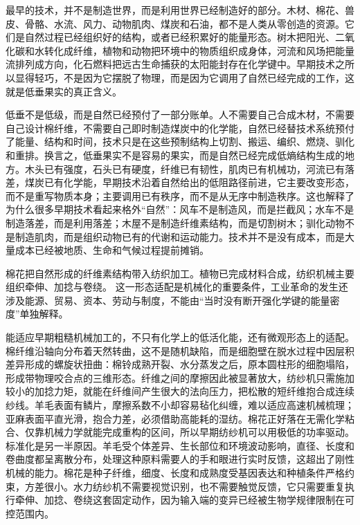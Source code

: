 最早的技术，并不是制造世界，而是利用世界已经制造好的部分。木材、棉花、兽皮、骨骼、水流、风力、动物肌肉、煤炭和石油，都不是人类从零创造的资源。它们是自然过程已经组织好的结构，或者已经积累好的能量形态。树木把阳光、二氧化碳和水转化成纤维，植物和动物把环境中的物质组织成身体，河流和风场把能量流排列成方向，化石燃料把远古生命捕获的太阳能封存在化学键中。早期技术之所以显得轻巧，不是因为它摆脱了物理，而是因为它调用了自然已经完成的工作，这就是低垂果实的真正含义。


低垂不是低级，而是自然已经预付了一部分账单。人不需要自己合成木材，不需要自己设计棉纤维，不需要自己即时制造煤炭中的化学能，自然已经替技术系统预付了能量、结构和时间，技术只是在这些预制结构上切割、搬运、编织、燃烧、驯化和重排。换言之，低垂果实不是容易的果实，而是自然已经完成低熵结构生成的地方。木头已有强度，石头已有硬度，纤维已有韧性，肌肉已有机械功，河流已有落差，煤炭已有化学能，早期技术沿着自然给出的低阻路径前进，它主要改变形态，而不是重写物质本身；主要调用已有秩序，而不是从无序中制造秩序。这也解释了为什么很多早期技术看起来格外“自然”：风车不是制造风，而是拦截风；水车不是制造落差，而是利用落差；木屋不是制造纤维素结构，而是切割树木；驯化动物不是制造肌肉，而是组织动物已有的代谢和运动能力。技术并不是没有成本，而是大量成本已经被地质、生命和气候过程提前摊销。

棉花把自然形成的纤维素结构带入纺织加工。植物已完成材料合成，纺织机械主要组织牵伸、加捻与卷绕。\cite{klemm2005cellulose} 这一形态适配是机械化的重要条件，工业革命的发生还涉及能源、贸易、资本、劳动与制度，不能由“当时没有断开强化学键的能量密度”单独解释。

能适应早期粗糙机械加工的，不只有化学上的低活化能，还有微观形态上的适配。棉纤维沿轴向分布着天然转曲，这不是随机缺陷，而是细胞壁在脱水过程中因层积差异形成的螺旋状扭曲：棉铃成熟开裂、水分蒸发之后，原本圆柱形的细胞塌陷，形成带物理咬合点的三维形态。纤维之间的摩擦因此被显著放大，纺纱机只需施加较小的加捻力矩，就能在纤维间产生很大的法向压力，把松散的短纤维抱合成连续纱线。羊毛表面有鳞片，摩擦系数不小却容易毡化纠缠，难以适应高速机械梳理；亚麻表面平直光滑，抱合力差，必须借助高能耗的湿纺。棉花正好落在无需化学粘合、仅靠机械力学就能完成重构的区间，所以早期纺纱机可以用极低的功率驱动。标准化是另一半原因。羊毛受个体差异、生长部位和环境波动影响，直径、长度和卷曲度都呈离散分布，处理这种原料需要人的手和眼进行实时反馈，这超出了刚性机械的能力。棉花是种子纤维，细度、长度和成熟度受基因表达和种植条件严格约束，方差很小。水力纺纱机不需要视觉识别，也不需要触觉反馈，它只需要重复执行牵伸、加捻、卷绕这套固定动作，因为输入端的变异已经被生物学规律限制在可控范围内。

